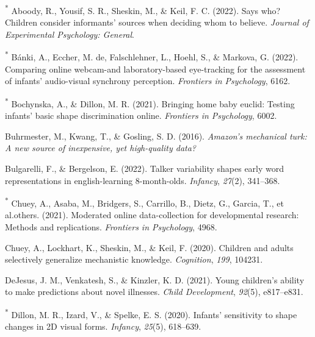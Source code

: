 \documentclass[
  man,floatsintext]{apa6}
\newlength{\cslhangindent}
\newlength{\cslentryspacingunit} %
\newenvironment{CSLReferences}[2] %
 {%
  \setlength{\parindent}{0pt}
  \ifodd #1
  \let\oldpar\par
  \def\par{\hangindent=\cslhangindent\oldpar}
  \fi
  \setlength{\parskip}{#2\cslentryspacingunit}
 }%
 {}
\begin{document}
\hypertarget{refs}{}
\begin{CSLReferences}{1}{0}
\leavevmode{}%
\textsuperscript{*} Aboody, R., Yousif, S. R., Sheskin, M., \& Keil, F. C. (2022). Says who? Children consider informants' sources when deciding whom to believe. \emph{Journal of Experimental Psychology: General}.

\leavevmode{}%
\textsuperscript{*} Bánki, A., Eccher, M. de, Falschlehner, L., Hoehl, S., \& Markova, G. (2022). Comparing online webcam-and laboratory-based eye-tracking for the assessment of infants' audio-visual synchrony perception. \emph{Frontiers in Psychology}, 6162.

\leavevmode{}%
\textsuperscript{*} Bochynska, A., \& Dillon, M. R. (2021). Bringing home baby euclid: Testing infants' basic shape discrimination online. \emph{Frontiers in Psychology}, 6002.

\leavevmode{}%
Buhrmester, M., Kwang, T., \& Gosling, S. D. (2016). \emph{Amazon's mechanical turk: A new source of inexpensive, yet high-quality data?}

\leavevmode{}%
Bulgarelli, F., \& Bergelson, E. (2022). Talker variability shapes early word representations in english-learning 8-month-olds. \emph{Infancy}, \emph{27}(2), 341--368.

\leavevmode{}%
\textsuperscript{*} Chuey, A., Asaba, M., Bridgers, S., Carrillo, B., Dietz, G., Garcia, T., et al.others. (2021). Moderated online data-collection for developmental research: Methods and replications. \emph{Frontiers in Psychology}, 4968.

\leavevmode{}%
Chuey, A., Lockhart, K., Sheskin, M., \& Keil, F. (2020). Children and adults selectively generalize mechanistic knowledge. \emph{Cognition}, \emph{199}, 104231.

\leavevmode{}%
DeJesus, J. M., Venkatesh, S., \& Kinzler, K. D. (2021). Young children's ability to make predictions about novel illnesses. \emph{Child Development}, \emph{92}(5), e817--e831.

\leavevmode{}%
\textsuperscript{*} Dillon, M. R., Izard, V., \& Spelke, E. S. (2020). Infants' sensitivity to shape changes in 2D visual forms. \emph{Infancy}, \emph{25}(5), 618--639.


\end{CSLReferences}
\end{document}
